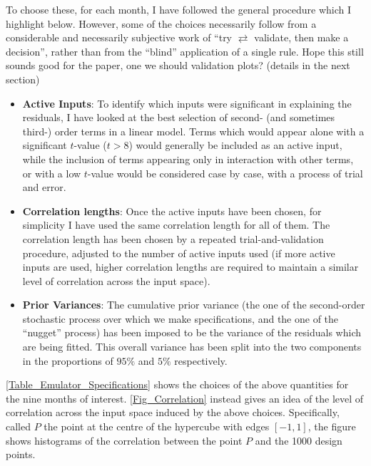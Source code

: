 \documentclass[a4paper, 12pt]{article}
\begin{document}
To choose these, for each month, I have followed the general procedure which I highlight below. However, some of the choices necessarily follow from a considerable and necessarily subjective work of ``try $\rightleftarrows$ validate, then make a decision'', rather than from the ``blind'' application of a single rule. Hope this still sounds good for the paper, one we should validation plots? (details in the next section)

\begin{itemize}
\item {\bf Active Inputs}: To identify which inputs were significant in explaining the residuals, I have looked at the best selection of second- (and sometimes third-) order terms in a linear model. 
Terms which would appear alone with a significant $t$-value ($t>8$) would generally be included as an active input, while the inclusion of terms appearing only in interaction with other terms, or with a low $t$-value would be considered case by case, with a process of trial and error.
\item {\bf Correlation lengths}: Once the active inputs have been chosen, for simplicity I have used the same correlation length for all of them. The correlation length has been chosen by a repeated trial-and-validation procedure, adjusted to the number of active inputs used (if more active inputs are used, higher correlation lengths are required to maintain a similar level of correlation across the input space).
\item {\bf Prior Variances}: The cumulative prior variance (the one of the second-order stochastic process over which we make specifications, and the one of the ``nugget'' process) has been imposed to be the variance of the residuals which are being fitted. This overall variance has been split into the two components in the proportions of $95\%$ and $5\%$ respectively.
\end{itemize}

\autoref{Table_Emulator_Specifications} shows the choices of the above quantities for the nine months of interest.
\autoref{Fig_Correlation} instead gives an idea of the level of correlation across the input space induced by the above choices. Specifically, called $P$ the point at the centre of the hypercube with edges $[-1,1]$, the figure shows histograms of the correlation between the point $P$ and the 1000 design points.
\end{document}
